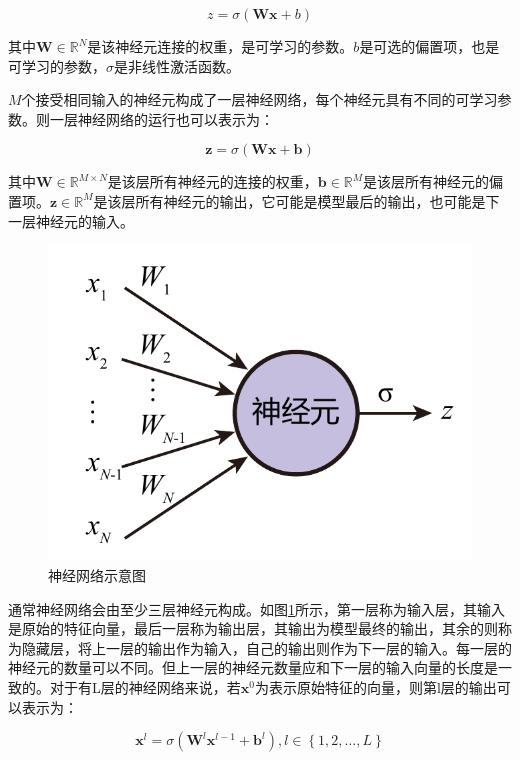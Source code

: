 \begin{equation}
    z=\sigma\left(\bm{W}\bm{x}+b\right)
\end{equation}

其中$\bm{W}\in\mathbb{R}^N$是该神经元连接的权重，是可学习的参数。$b$是可选的偏置项，也是可学习的参数，$\sigma$是非线性激活函数。

$M$个接受相同输入的神经元构成了一层神经网络，每个神经元具有不同的可学习参数。则一层神经网络的运行也可以表示为：

\begin{equation}
    \bm{z}=\sigma\left(\bm{W}\bm{x}+\bm{b}\right)
\end{equation}

其中$\bm{W}\in\mathbb{R}^{M\times N}$是该层所有神经元的连接的权重，$\bm{b}\in\mathbb{R}^M$是该层所有神经元的偏置项。$\bm{z}\in\mathbb{R}^M$是该层所有神经元的输出，它可能是模型最后的输出，也可能是下一层神经元的输入。

\begin{figure}[]
    \centering
    \includegraphics[page=2]{figure/figures.pdf}
    \caption{神经网络示意图}
    \label{nnet}
\end{figure}

通常神经网络会由至少三层神经元构成。如图\ref{nnet}所示，第一层称为输入层，其输入是原始的特征向量，最后一层称为输出层，其输出为模型最终的输出，其余的则称为隐藏层，将上一层的输出作为输入，自己的输出则作为下一层的输入。每一层的神经元的数量可以不同。但上一层的神经元数量应和下一层的输入向量的长度是一致的。对于有L层的神经网络来说，若$\bm{x}^0$为表示原始特征的向量，则第l层的输出可以表示为：

\begin{equation}
    \bm{x}^l=\sigma\left(\bm{W}^l\bm{x}^{l-1}+\bm{b}^l\right),l\in\left\{1,2,\ldots,L\right\}
\end{equation}

